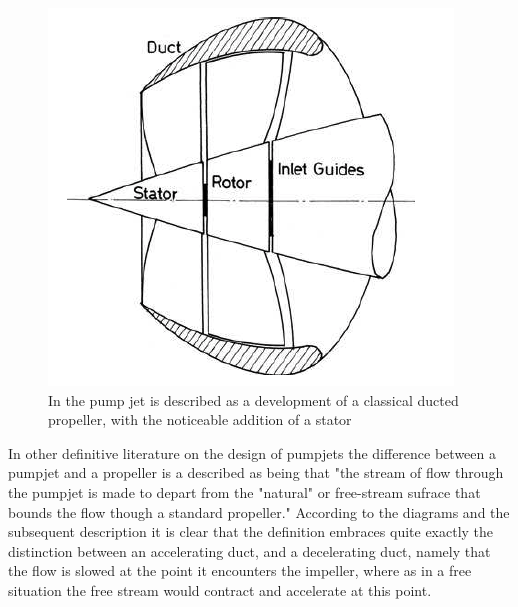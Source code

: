\documentclass{article}\usepackage[]{graphicx}\usepackage[]{color}
\begin{document}
\begin{figure}
\includegraphics[width=\textwidth]{PumpjetOutline.png}
\caption{In \cite{carlton2007} the pump jet is described as a development of a classical ducted propeller, with the noticeable addition of a stator}
\label{fig:PumpjetOutline.png}
\end{figure}

In other definitive literature on the design of pumpjets \parencite{henderson1964} the difference between a pumpjet and a propeller is a described as being that "the stream of flow through the pumpjet is made to depart from the "natural" or free-stream sufrace that bounds the flow though a standard propeller."  According to the diagrams and the subsequent description it is clear that the definition embraces quite exactly the distinction between an accelerating duct, and a decelerating duct, namely that the flow is slowed at the point it encounters the impeller, where as in a free situation the free stream would contract and accelerate at this point.
\end{document}
